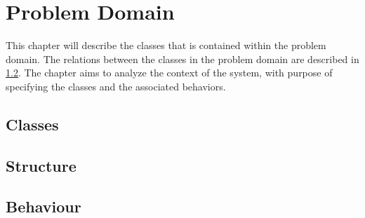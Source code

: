 \chapter{Problem Domain}

This chapter will describe the classes that is contained within the problem domain. The relations between the classes in the problem domain are described in \cref{sub:Structure}. The chapter aims to analyze the context of the system, with purpose of specifying the classes and the associated behaviors.

\section{Classes}
\label{sub:pd_classes}


\section{Structure}
\label{sub:Structure}


\section{Behaviour}

